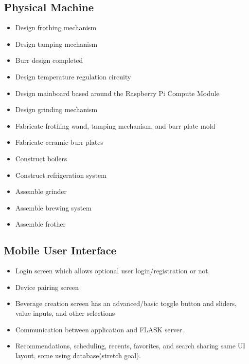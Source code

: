 \documentclass[conference]{IEEEtran}
\begin{document}
\begin{itemize}
\subsection{Physical Machine}

\begin{itemize}
\item Design frothing mechanism
\item Design tamping mechanism
\item Burr design completed
\item Design temperature regulation circuity
\item Design mainboard based around the Raspberry Pi Compute Module
\item Design grinding mechanism
\item Fabricate frothing wand, tamping mechanism, and burr plate mold
\item Fabricate ceramic burr plates
\item Construct boilers
\item Construct refrigeration system
\item Assemble grinder
\item Assemble brewing system
\item Assemble frother
\end{itemize}

\subsection{Mobile User Interface}
\begin{itemize}
  \item Login screen which allows optional user login/registration or not.
  \item Device pairing screen
  \item Beverage creation screen has an advanced/basic toggle button and sliders, value inputs, and other selections
  \item Communication between application and FLASK server.
  \item Recommendations, scheduling, recents, favorites, and search sharing same UI layout, some using database(stretch goal).
\end{itemize}


\end{itemize}
\end{document}
